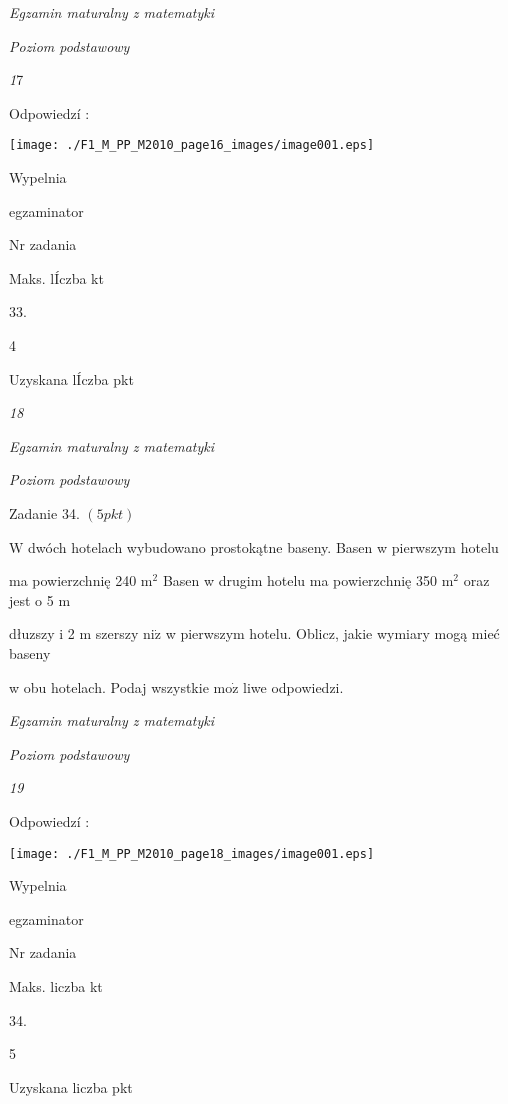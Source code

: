 \documentclass[a4paper,12pt]{article}
\begin{document}
{\it Egzamin maturalny z matematyki}

{\it Poziom podstawowy}

{\it 1}7

Odpowiedzí :
\begin{center}
\texttt{[image: ./F1\_M\_PP\_M2010\_page16\_images/image001.eps]}
\end{center}
Wypelnia

egzaminator

Nr zadania

Maks. lÍczba kt

33.

4

Uzyskana lÍczba pkt





{\it 18}

{\it Egzamin maturalny z matematyki}

{\it Poziom podstawowy}

Zadanie 34. $(5pkt)$

$\mathrm{W}$ dwóch hotelach wybudowano prostokątne baseny. Basen w pierwszym hotelu

ma powierzchnię 240 $\mathrm{m}^{2}$ Basen w drugim hotelu ma powierzchnię 350 $\mathrm{m}^{2}$ oraz jest o 5 $\mathrm{m}$

dłuzszy i 2 $\mathrm{m}$ szerszy $\mathrm{n}\mathrm{i}\dot{\mathrm{z}}$ w pierwszym hotelu. Oblicz, jakie wymiary mogą mieć baseny

w obu hotelach. Podaj wszystkie $\mathrm{m}\mathrm{o}\dot{\mathrm{z}}$ liwe odpowiedzi.





{\it Egzamin maturalny z matematyki}

{\it Poziom podstawowy}

{\it 19}

Odpowiedzí :
\begin{center}
\texttt{[image: ./F1\_M\_PP\_M2010\_page18\_images/image001.eps]}
\end{center}
Wypelnia

egzaminator

Nr zadania

Maks. liczba kt

34.

5

Uzyskana liczba pkt
\end{document}
